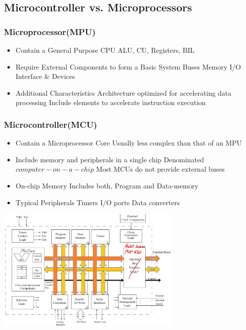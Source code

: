 \subsection{Microcontroller vs. Microprocessors}
\begin{multicols}{2}
		\subsubsection{Microprocessor(MPU)}
		\begin{itemize}
			\item Contain a General Purpose CPU
			\subitem ALU, CU, Registers, BIL %
			\item Require External Components to form a Basic System
			\subitem Buses
			\subitem Memory
			\subitem I/O Interface \& Devices
			\item Additional Characteristics
			\subitem Architecture optimized for accelerating data processing
			\subitem Include elements to accelerate instruction execution  
		\end{itemize}
\subsubsection{Microcontroller(MCU)}
		\begin{itemize}
			\item Contain a Microprocessor Core
			\subitem Usually less complex than that of an MPU
			\item Include memory and peripherals in a single chip
			\subitem Denominated $ computer-on-a-chip $ 
			\subitem Most MCUs do not provide external buses
			\item On-chip Memory
			\subitem Includes both, Program and Data-memory
			\item Typical Peripherals
			\subitem Timers
			\subitem I/O ports
			\subitem Data converters
		\end{itemize}
\end{multicols}
\begin{center}
	\includegraphics[width=9cm]{images/mCStructure}
\end{center}
\pagebreak

